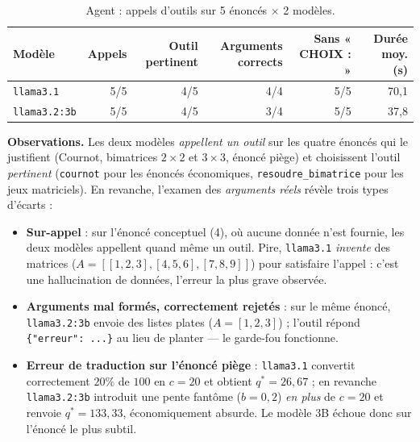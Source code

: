 \documentclass[11pt,a4paper]{article}
\begin{document}
\begin{table}[h]
\centering
\caption{Agent : appels d'outils sur 5 énoncés $\times$ 2 modèles.}
\label{tab:agent}
\begin{tabular}{lrrrrr}
\toprule
Modèle & Appels & Outil pertinent & Arguments corrects & Sans « CHOIX : » & Durée moy. (s) \\
\midrule
\texttt{llama3.1}    & 5/5 & 4/5 & 4/4 & 5/5 & 70{,}1 \\
\texttt{llama3.2:3b} & 5/5 & 4/5 & 3/4 & 5/5 & 37{,}8 \\
\bottomrule
\end{tabular}
\end{table}


\noindent\textbf{Observations.} Les deux modèles \emph{appellent un outil} sur les quatre
énoncés qui le justifient (Cournot, bimatrices $2\times2$ et $3\times3$, énoncé piège) et
choisissent l'outil \emph{pertinent} (\texttt{cournot} pour les énoncés économiques,
\texttt{resoudre\_bimatrice} pour les jeux matriciels). En revanche, l'examen des
\emph{arguments réels} révèle trois types d'écarts :

\begin{itemize}[nosep]
  \item \textbf{Sur-appel} : sur l'énoncé conceptuel (4), où aucune donnée n'est fournie,
        les deux modèles appellent quand même un outil. Pire, \texttt{llama3.1}
        \emph{invente} des matrices ($A=[[1,2,3],[4,5,6],[7,8,9]]$) pour satisfaire l'appel :
        c'est une hallucination de données, l'erreur la plus grave observée.
  \item \textbf{Arguments mal formés, correctement rejetés} : sur le même énoncé,
        \texttt{llama3.2:3b} envoie des listes plates ($A=[1,2,3]$) ; l'outil répond
        \texttt{\{"erreur": ...\}} au lieu de planter — le garde-fou fonctionne.
  \item \textbf{Erreur de traduction sur l'énoncé piège} : \texttt{llama3.1} convertit
        correctement $20\%$ de $100$ en $c=20$ et obtient $q^{*}=26{,}67$ ; en revanche
        \texttt{llama3.2:3b} introduit une pente fantôme ($b=0{,}2$) \emph{en plus} de
        $c=20$ et renvoie $q^{*}=133{,}33$, économiquement absurde. Le modèle 3B échoue donc
        sur l'énoncé le plus subtil.
\end{itemize}
\end{document}
